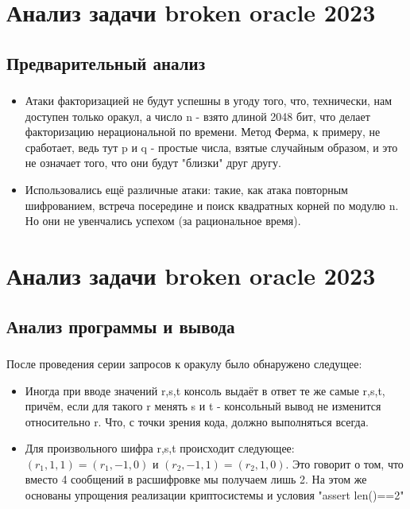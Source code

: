 \documentclass[t]{beamer}
\begin{document}
\section{Анализ задачи broken oracle 2023}
\subsection{Предварительный анализ}
\begin{frame}
	\frametitle{\insertsection}
	\framesubtitle{\insertsubsection}
    \begin{itemize}
        \item Атаки факторизацией не будут успешны в угоду того, что, технически, нам доступен только оракул, а число n - взято длиной 2048 бит, что делает факторизацию нерациональной по времени. Метод Ферма, к примеру, не сработает, ведь тут p и q - простые числа, взятые случайным образом, и это не означает того, что они будут "близки" друг другу.\newline
        \item Использовались ещё различные атаки: такие, как атака повторным шифрованием, встреча посередине и поиск квадратных корней по модулю n. Но они не увенчались успехом (за рациональное время).
    \end{itemize}
\end{frame}

\section{Анализ задачи broken oracle 2023}
\subsection{Анализ программы и вывода}
\begin{frame}
	\frametitle{\insertsection}
	\framesubtitle{\insertsubsection}
    После проведения серии запросов к оракулу было обнаружено следущее:
    \begin{itemize}
        \item Иногда при вводе значений r,s,t консоль выдаёт в ответ те же самые r,s,t, причём, если для такого r менять s и t - консольный вывод не изменится относительно r. Что, с точки зрения кода, должно выполняться всегда.
        \item Для произвольного шифра r,s,t происходит следующее: $(r_1,1,1)=(r_1,-1,0)$ и $(r_2,-1,1)=(r_2,1,0)$. Это говорит о том, что вместо 4 сообщений в расшифровке мы получаем лишь 2. На этом же основаны упрощения реализации криптосистемы и условия "assert len()==2"
    \end{itemize}
\end{frame}
\end{document}
